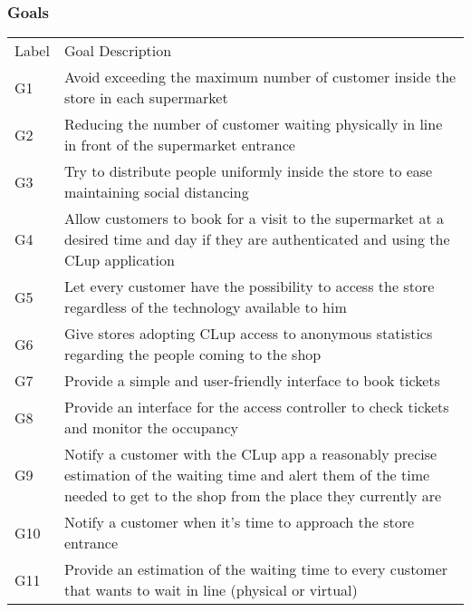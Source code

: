 \vfill

\pagebreak

\subsubsection{Goals}
\renewcommand{\arraystretch}{1.4}
\begin{tabular}{C{1cm}L{14.1cm}}
      Label & Goal Description                                                                                                                                                               \\
      G1    & Avoid exceeding the maximum number of customer inside the store in each supermarket                                                                                            \\
      G2    & Reducing the number of customer waiting physically in line in front of the supermarket entrance                                                                                \\
      G3    & Try to distribute people uniformly inside the store to ease maintaining social distancing                                                                                      \\
      G4    & Allow customers to book for a visit to the supermarket at a desired time and day if they are authenticated and using the CLup application                                      \\
      G5    & Let every customer have the possibility to access the store regardless of the technology available to him                                                                      \\
      G6    & Give stores adopting CLup access to anonymous statistics regarding the people coming to the shop                                                                               \\
      G7    & Provide a simple and user-friendly interface to book tickets                                                                                                                   \\
      G8    & Provide an interface for the access controller to check tickets and monitor the occupancy                                                                                      \\
      G9    & Notify a customer with the CLup app a reasonably precise estimation of the waiting time and alert them of the time needed to get to the shop from the place they currently are \\
      G10   & Notify a customer when it's time to approach the store entrance                                                                                                                \\
      G11   & Provide an estimation of the waiting time to every customer that wants to wait in line (physical or virtual)                                                                   \\
\end{tabular}
